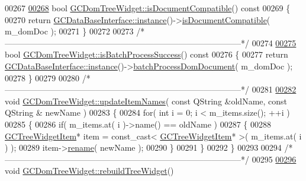 \begin{DoxyCode}
00267 
\hypertarget{gcdomtreewidget_8cpp_source_l00268}{}\hyperlink{class_g_c_dom_tree_widget_a123f18a1174ae99e567f6a2335ce1824}{00268} \textcolor{keywordtype}{bool} \hyperlink{class_g_c_dom_tree_widget_a123f18a1174ae99e567f6a2335ce1824}{GCDomTreeWidget::isDocumentCompatible}()\textcolor{keyword}{ const}
00269 \textcolor{keyword}{}\{
00270   \textcolor{keywordflow}{return} \hyperlink{class_g_c_data_base_interface_a1baea9c0667aa8b610ec30076fcab84c}{GCDataBaseInterface::instance}()->\hyperlink{class_g_c_data_base_interface_ae16d516cbefe58ccf9ef0e8ece4a394f}{isDocumentCompatible}( m\_domDoc );
00271 \}
00272 
00273 \textcolor{comment}{/*
      --------------------------------------------------------------------------------------*/}
00274 
\hypertarget{gcdomtreewidget_8cpp_source_l00275}{}\hyperlink{class_g_c_dom_tree_widget_ac8a71d6111a3615a5a7eecea457a3a34}{00275} \textcolor{keywordtype}{bool} \hyperlink{class_g_c_dom_tree_widget_ac8a71d6111a3615a5a7eecea457a3a34}{GCDomTreeWidget::isBatchProcessSuccess}()\textcolor{keyword}{ const}
00276 \textcolor{keyword}{}\{
00277   \textcolor{keywordflow}{return} \hyperlink{class_g_c_data_base_interface_a1baea9c0667aa8b610ec30076fcab84c}{GCDataBaseInterface::instance}()->\hyperlink{class_g_c_data_base_interface_a2c20ff88464664aef988c9c0417e19be}{batchProcessDomDocument}( m\_domDoc );
00278 \}
00279 
00280 \textcolor{comment}{/*
      --------------------------------------------------------------------------------------*/}
00281 
\hypertarget{gcdomtreewidget_8cpp_source_l00282}{}\hyperlink{class_g_c_dom_tree_widget_a1ec3ed3851e25adf1fac93fb42a4a8a7}{00282} \textcolor{keywordtype}{void} \hyperlink{class_g_c_dom_tree_widget_a1ec3ed3851e25adf1fac93fb42a4a8a7}{GCDomTreeWidget::updateItemNames}( \textcolor{keyword}{const} QString &oldName, \textcolor{keyword}{const} QString &
      newName )
00283 \{
00284   \textcolor{keywordflow}{for}( \textcolor{keywordtype}{int} i = 0; i < m\_items.size(); ++i )
00285   \{
00286     \textcolor{keywordflow}{if}( m\_items.at( i )->name() == oldName )
00287     \{
00288       \hyperlink{class_g_c_tree_widget_item}{GCTreeWidgetItem}* item = \textcolor{keyword}{const\_cast<} \hyperlink{class_g_c_tree_widget_item}{GCTreeWidgetItem}* \textcolor{keyword}{>}( m\_items.at( i )
       );
00289       item->\hyperlink{class_g_c_tree_widget_item_a831acd54bf1060e3ec45a8e46439385a}{rename}( newName );
00290     \}
00291   \}
00292 \}
00293 
00294 \textcolor{comment}{/*
      --------------------------------------------------------------------------------------*/}
00295 
\hypertarget{gcdomtreewidget_8cpp_source_l00296}{}\hyperlink{class_g_c_dom_tree_widget_a0ac81800aa6d507dd17cbffa6814a632}{00296} \textcolor{keywordtype}{void} \hyperlink{class_g_c_dom_tree_widget_a0ac81800aa6d507dd17cbffa6814a632}{GCDomTreeWidget::rebuildTreeWidget}()

\end{DoxyCode}
